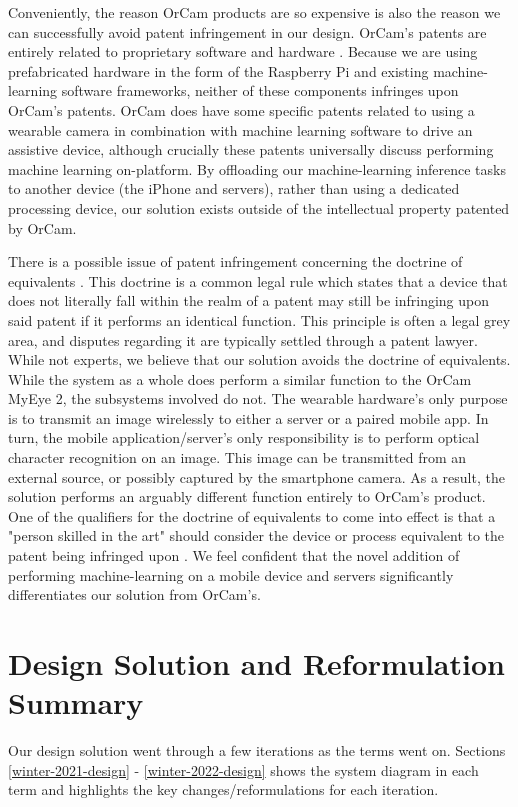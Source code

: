 \documentclass[a4paper,11pt]{article}
\begin{document}
Conveniently, the reason OrCam products are so expensive is also the reason we can successfully avoid patent infringement in our design. OrCam's patents are entirely related to proprietary software \cite{orcam-software} and hardware \cite{orcam-hardware}. Because we are using prefabricated hardware in the form of the Raspberry Pi and existing machine-learning software frameworks, neither of these components infringes upon OrCam's patents. OrCam does have some specific patents related to using a wearable camera in combination with machine learning software to drive an assistive device, although crucially these patents universally discuss performing machine learning on-platform. By offloading our machine-learning inference tasks to another device (the iPhone and servers), rather than using a dedicated processing device, our solution exists outside of the intellectual property patented by OrCam.

There is a possible issue of patent infringement concerning the doctrine of equivalents \cite{doctrine-of-equivalents}. This doctrine is a common legal rule which states that a device that does not literally fall within the realm of a patent may still be infringing upon said patent if it performs an identical function. This principle is often a legal grey area, and disputes regarding it are typically settled through a patent lawyer. While not experts, we believe that our solution avoids the doctrine of equivalents. While the system as a whole does perform a similar function to the OrCam MyEye 2, the subsystems involved do not. The wearable hardware's only purpose is to transmit an image wirelessly to either a server or a paired mobile app. In turn, the mobile application/server's only responsibility is to perform optical character recognition on an image. This image can be transmitted from an external source, or possibly captured by the smartphone camera. As a result, the solution performs an arguably different function entirely to OrCam's product. One of the qualifiers for the doctrine of equivalents to come into effect is that a "person skilled in the art" should consider the device or process equivalent to the patent being infringed upon \cite{doctrine-of-equivalents}. We feel confident that the novel addition of performing machine-learning on a mobile device and servers significantly differentiates our solution from OrCam's.


\section{Design Solution and Reformulation Summary}
Our design solution went through a few iterations as the terms went on. Sections \ref{winter-2021-design} - \ref{winter-2022-design} shows the system diagram in each term and highlights the key changes/reformulations for each iteration.
\end{document}
